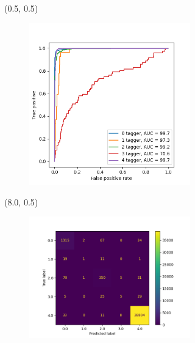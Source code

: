 \documentclass[12pt, xcolor={dvipsnames}, aspectratio = 169]{beamer}
\begin{document}
\begin{frame}

\begin{textblock}{7.0}(0.5, 0.5)
\begin{figure}
    \centering
    \includegraphics[width=7.0cm]{../imgs/roc-curve.png}
\end{figure}
\end{textblock}

\begin{textblock}{7.0}(8.0, 0.5)
\begin{figure}
    \centering
    \includegraphics[width=7.0cm]{../imgs/cm.png}
\end{figure}
\end{textblock}

\end{frame}
\end{document}
